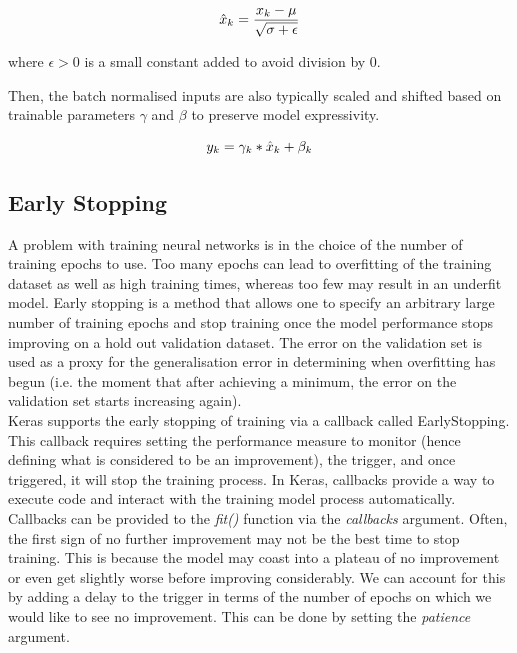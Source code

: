 \begin{equation}
  \centering
  \hat{x}_k = \frac{x_k - \mu}{\sqrt{\sigma + \epsilon}}
\end{equation}

where $\epsilon > 0$ is a small constant added to avoid division by 0. \smallskip

Then, the batch normalised inputs are also typically scaled and shifted based on trainable parameters $\gamma$ and $\beta$ to preserve model expressivity. 

\begin{equation}
  \centering
  y_k = \gamma_k * \hat{x}_k + \beta_k
\end{equation}

\subsection{Early Stopping}
A problem with training neural networks is in the choice of the number of training epochs to use. Too many epochs can lead to overfitting of the training dataset as well as high training times, whereas too few may result in an underfit model. Early stopping is a method that allows one to specify an arbitrary large number of training epochs and stop training once the model performance stops improving on a hold out validation dataset. The error on the validation set is used as a proxy for the generalisation error in determining when overfitting has begun (i.e. the moment that after achieving a minimum, the error on the validation set starts increasing again).\\

Keras supports the early stopping of training via a callback called EarlyStopping. This callback requires setting the performance measure to monitor (hence defining what is considered to be an improvement), the trigger, and once triggered, it will stop the training process. In Keras, callbacks provide a way to execute code and interact with the training model process automatically. Callbacks can be provided to the \textit{fit()} function via the \textit{callbacks} argument. Often, the first sign of no further improvement may not be the best time to stop training. This is because the model may coast into a plateau of no improvement or even get slightly worse before improving considerably. We can account for this by adding a delay to the trigger in terms of the number of epochs on which we would like to see no improvement. This can be done by setting the \textit{patience} argument. 


